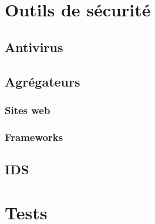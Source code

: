 \documentclass[smallextended]{svjour3}       %
\begin{document}
\section{Outils de sécurité}
\label{2.Outils}

\subsection{Antivirus}
\label{2.1antivirus}

\subsection{Agrégateurs}
\label{2.2agrégateurs}

\subsubsection{Sites web}
\label{2.2.1sites}

\subsubsection{Frameworks}
\label{2.2.2frameworks}

\subsection{IDS}
\label{2.3ids}


\section{Tests}
\label{3.Tests}
\end{document}
